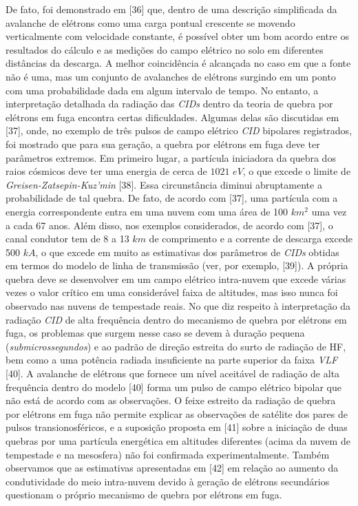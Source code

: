 \documentclass[a4paper, 12pt, onecolumn,singlespacing]{article}
\begin{document}
	De fato, foi demonstrado em [36] que, dentro de uma descrição simplificada da avalanche de elétrons como uma carga pontual crescente se movendo verticalmente com velocidade constante, é possível obter um bom acordo entre os resultados do cálculo e as medições do campo elétrico no solo em diferentes distâncias da descarga. A melhor coincidência é alcançada no caso em que a fonte não é uma, mas um conjunto de avalanches de elétrons surgindo em um ponto com uma probabilidade dada em algum intervalo de tempo. No entanto, a interpretação detalhada da radiação das \textit{CIDs} dentro da teoria de quebra por elétrons em fuga encontra certas dificuldades. Algumas delas são discutidas em [37], onde, no exemplo de três pulsos de campo elétrico \textit{CID} bipolares registrados, foi mostrado que para sua geração, a quebra por elétrons em fuga deve ter parâmetros extremos. Em primeiro lugar, a partícula iniciadora da quebra dos raios cósmicos deve ter uma energia de cerca de $1021$ $eV$, o que excede o limite de \textit{Greisen-Zatsepin-Kuz'min} [38]. Essa circunstância diminui abruptamente a probabilidade de tal quebra. De fato, de acordo com [37], uma partícula com a energia correspondente entra em uma nuvem com uma área de 100 $km^2$ uma vez a cada 67 anos. Além disso, nos exemplos considerados, de acordo com [37], o canal condutor tem de 8 a 13 $km$ de comprimento e a corrente de descarga excede 500 $kA$, o que excede em muito as estimativas dos parâmetros de \textit{CIDs} obtidas em termos do modelo de linha de transmissão (ver, por exemplo, [39]). A própria quebra deve se desenvolver em um campo elétrico intra-nuvem que excede várias vezes o valor crítico em uma considerável faixa de altitudes, mas isso nunca foi observado nas nuvens de tempestade reais. No que diz respeito à interpretação da radiação \textit{CID} de alta frequência dentro do mecanismo de quebra por elétrons em fuga, os problemas que surgem nesse caso se devem à duração pequena (\textit{submicrossegundos}) e ao padrão de direção estreita do surto de radiação de HF, bem como a uma potência radiada insuficiente na parte superior da faixa \textit{VLF} [40]. A avalanche de elétrons que fornece um nível aceitável de radiação de alta frequência dentro do modelo [40] forma um pulso de campo elétrico bipolar que não está de acordo com as observações. O feixe estreito da radiação de quebra por elétrons em fuga não permite explicar as observações de satélite dos pares de pulsos transionosféricos, e a suposição proposta em [41] sobre a iniciação de duas quebras por uma partícula energética em altitudes diferentes (acima da nuvem de tempestade e na mesosfera) não foi confirmada experimentalmente. Também observamos que as estimativas apresentadas em [42] em relação ao aumento da condutividade do meio intra-nuvem devido à geração de elétrons secundários questionam o próprio mecanismo de quebra por elétrons em fuga.
	
\end{document}
